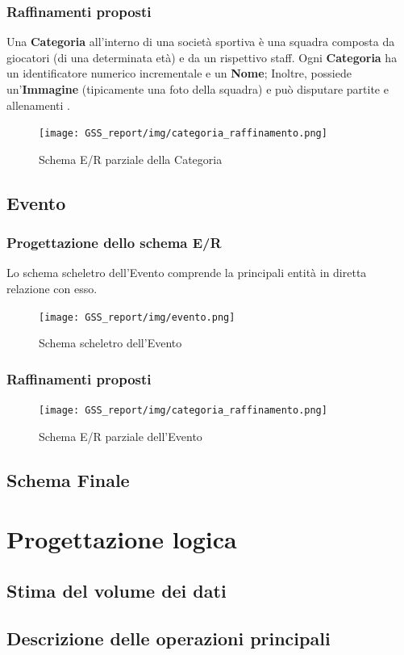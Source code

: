 \documentclass[a4paper,12pt]{report}
\begin{document}
\subsection{Raffinamenti proposti}
Una \textbf{Categoria} all'interno di una società sportiva è una squadra composta da giocatori (di una determinata età) e da un rispettivo staff.
Ogni \textbf{Categoria} ha un identificatore numerico incrementale e un \textbf{Nome}; Inoltre, possiede un'\textbf{Immagine} (tipicamente una foto della squadra) e può disputare partite e allenamenti .
\begin{figure}[htp]
    \centering
    \texttt{[image: GSS\_report/img/categoria\_raffinamento.png]}
    \caption{Schema E/R parziale della Categoria}
\end{figure}

\newpage
\section{Evento}
\subsection{Progettazione dello schema E/R}
Lo schema scheletro dell'Evento comprende la principali entità in diretta relazione con esso.
\begin{figure}[htp]
    \centering
    \texttt{[image: GSS\_report/img/evento.png]}
    \caption{Schema scheletro dell'Evento}
\end{figure}
\subsection{Raffinamenti proposti}
\begin{figure}[htp]
    \centering
    \texttt{[image: GSS\_report/img/categoria\_raffinamento.png]}
    \caption{Schema E/R parziale dell'Evento}
\end{figure}
\newpage
\section{Schema Finale}

\chapter{Progettazione logica}
\section{Stima del volume dei dati}
\section{Descrizione delle operazioni principali}
\end{document}
